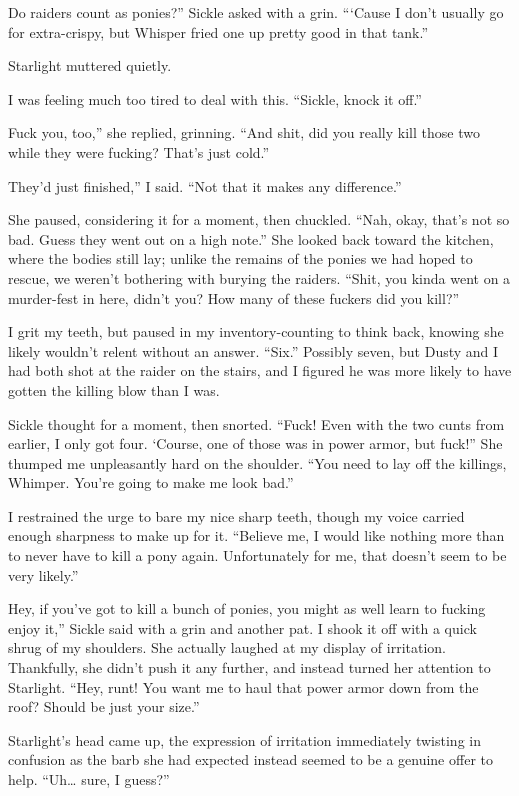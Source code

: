 \leavevmode{}Do raiders count as ponies?” Sickle asked with a grin. “‘Cause I don’t usually go for extra-crispy, but Whisper fried one up pretty good in that tank.”

Starlight muttered quietly.

I was feeling much too tired to deal with this. “Sickle, knock it off.”

\leavevmode{}Fuck you, too,” she replied, grinning. “And shit, did you really kill those two while they were fucking? That’s just cold.”

\leavevmode{}They’d just finished,” I said. “Not that it makes any difference.”

She paused, considering it for a moment, then chuckled. “Nah, okay, that’s not so bad. Guess they went out on a high note.” She looked back toward the kitchen, where the bodies still lay; unlike the remains of the ponies we had hoped to rescue, we weren’t bothering with burying the raiders. “Shit, you kinda went on a murder-fest in here, didn’t you? How many of these fuckers did you kill?”

I grit my teeth, but paused in my inventory-counting to think back, knowing she likely wouldn’t relent without an answer. “Six.” Possibly seven, but Dusty and I had both shot at the raider on the stairs, and I figured he was more likely to have gotten the killing blow than I was.

Sickle thought for a moment, then snorted. “Fuck! Even with the two cunts from earlier, I only got four. ‘Course, one of those was in power armor, but fuck!” She thumped me unpleasantly hard on the shoulder. “You need to lay off the killings, Whimper. You’re going to make me look bad.”

I restrained the urge to bare my nice sharp teeth, though my voice carried enough sharpness to make up for it. “Believe me, I would like nothing more than to never have to kill a pony again. Unfortunately for me, that doesn’t seem to be very likely.”

\leavevmode{}Hey, if you’ve got to kill a bunch of ponies, you might as well learn to fucking enjoy it,” Sickle said with a grin and another pat. I shook it off with a quick shrug of my shoulders. She actually laughed at my display of irritation. Thankfully, she didn’t push it any further, and instead turned her attention to Starlight. “Hey, runt! You want me to haul that power armor down from the roof? Should be just your size.”

Starlight’s head came up, the expression of irritation immediately twisting in confusion as the barb she had expected instead seemed to be a genuine offer to help. “Uh… sure, I guess?”

